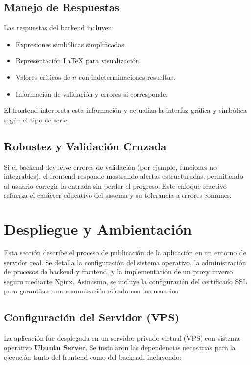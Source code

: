 \subsection{Manejo de Respuestas}

Las respuestas del backend incluyen:

\begin{itemize}
	\item Expresiones simbólicas simplificadas.
	\item Representación LaTeX para visualización.
	\item Valores críticos de $n$ con indeterminaciones resueltas.
	\item Información de validación y errores si corresponde.
\end{itemize}

El frontend interpreta esta información y actualiza la interfaz gráfica y simbólica según el tipo de serie.

\subsection{Robustez y Validación Cruzada}

Si el backend devuelve errores de validación (por ejemplo, funciones no integrables), el frontend responde mostrando alertas estructuradas, permitiendo al usuario corregir la entrada sin perder el progreso. Este enfoque reactivo refuerza el carácter educativo del sistema y su tolerancia a errores comunes.

\section{Despliegue y Ambientación}
\label{sec:despliegue}
Esta sección describe el proceso de publicación de la aplicación en un entorno de servidor real. Se detalla la configuración del sistema operativo, la administración de procesos de backend y frontend, y la implementación de un proxy inverso seguro mediante Nginx. Asimismo, se incluye la configuración del certificado SSL para garantizar una comunicación cifrada con los usuarios.

\subsection{Configuración del Servidor (VPS)}

La aplicación fue desplegada en un servidor privado virtual (VPS) con sistema operativo \textbf{Ubuntu Server}. Se instalaron las dependencias necesarias para la ejecución tanto del frontend como del backend, incluyendo:

